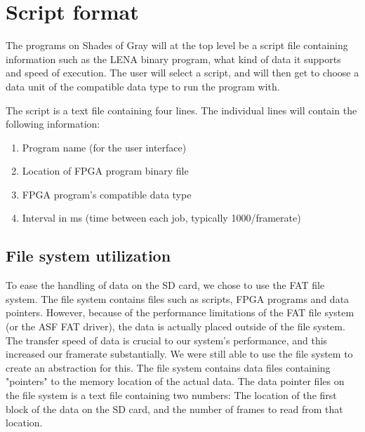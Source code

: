 \section{Script format}

The programs on { Shades of Gray} will at the top level be a script file
containing information such as the \ac{LENA} binary program, what kind of data
it supports and speed of execution. The user will select a script, and will then
get to choose a data unit of the compatible data type to run the program with.

The script is a text file containing four lines. The individual lines will
contain the following information:

\begin{enumerate}
\item Program name (for the user interface)
\item Location of \ac{FPGA} program binary file
\item \ac{FPGA} program's compatible data type
\item Interval in ms (time between each job, typically 1000/framerate)
\end{enumerate}

\subsection{File system utilization}
To ease the handling of data on the \ac{SD} card, we chose to use the \ac{FAT}
file system. The file system contains files such as scripts, \ac{FPGA} programs
and data pointers. However, because of the performance limitations of the
\ac{FAT} file system (or the \ac{ASF} \ac{FAT} driver), the data is actually
placed outside of the file system. The transfer speed of data is crucial to our
system's performance, and this increased our framerate substantially. We were
still able to use the file system to create an abstraction for this. The file
system contains data files containing "pointers" to the memory location of the
actual data. The data pointer files on the file system is a text file containing
two numbers: The location of the first block of the data on the \ac{SD} card,
and the number of frames to read from that location.

